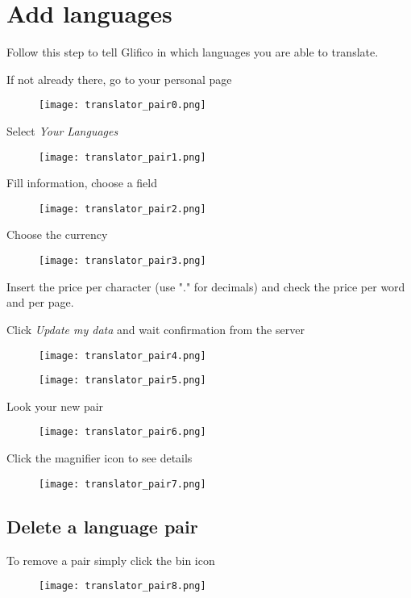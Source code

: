 \documentclass[11 pt, a4paper]{article}
\begin{document}
\clearpage
\section{Add languages}
Follow this step to tell Glifico in which languages you are able to translate.

If not already there, go to your personal page
\begin{figure}[H]
\centering
\texttt{[image: translator\_pair0.png]}
\end{figure}

Select \textit{Your Languages}
\begin{figure}[H]
\centering
\texttt{[image: translator\_pair1.png]}
\end{figure}


\clearpage
Fill information, choose a field 
\begin{figure}[H]
\centering
\texttt{[image: translator\_pair2.png]}
\end{figure}

Choose the currency
\begin{figure}[H]
\centering
\texttt{[image: translator\_pair3.png]}
\end{figure}
Insert the price per character (use "." for decimals) and check the price per word and per page.

\clearpage
Click \textit{Update my data} and wait confirmation from the server
\begin{figure}[H]
\centering
\texttt{[image: translator\_pair4.png]}
\end{figure}


\begin{figure}[H]
\centering
\texttt{[image: translator\_pair5.png]}
\end{figure}


\clearpage
Look your new pair
\begin{figure}[H]
\centering
\texttt{[image: translator\_pair6.png]}
\end{figure}

Click the magnifier icon to see details
\begin{figure}[H]
\centering
\texttt{[image: translator\_pair7.png]}
\end{figure}


\clearpage
\subsection{Delete a language pair}
To remove a pair simply click the bin icon
\begin{figure}[H]
\centering
\texttt{[image: translator\_pair8.png]}
\end{figure}
\end{document}
